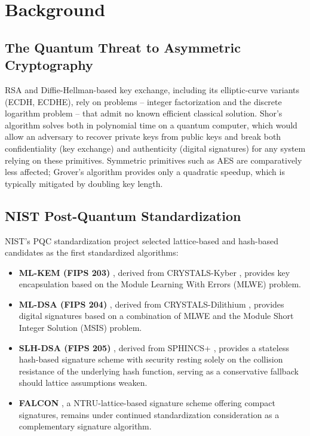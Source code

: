 \documentclass[conference]{IEEEtran}
\begin{document}
\section{Background}

\subsection{The Quantum Threat to Asymmetric Cryptography}

RSA and Diffie-Hellman-based key exchange, including its elliptic-curve
variants (ECDH, ECDHE), rely on problems -- integer factorization and the
discrete logarithm problem -- that admit no known efficient classical
solution. Shor's algorithm \cite{shor1997} solves both in polynomial time
on a quantum computer, which would allow an adversary to recover private
keys from public keys and break both confidentiality (key exchange) and
authenticity (digital signatures) for any system relying on these
primitives. Symmetric primitives such as AES are comparatively less
affected; Grover's algorithm provides only a quadratic speedup, which is
typically mitigated by doubling key length.

\subsection{NIST Post-Quantum Standardization}

NIST's PQC standardization project \cite{nist_pqc_project} selected
lattice-based and hash-based candidates as the first standardized
algorithms:

\begin{itemize}
  \item \textbf{ML-KEM (FIPS 203)} \cite{nist_fips203}, derived from
        CRYSTALS-Kyber \cite{kyber}, provides key encapsulation based on the
        Module Learning With Errors (MLWE) problem.
  \item \textbf{ML-DSA (FIPS 204)} \cite{nist_fips204}, derived from
        CRYSTALS-Dilithium \cite{dilithium}, provides digital signatures
        based on a combination of MLWE and the Module Short Integer
        Solution (MSIS) problem.
  \item \textbf{SLH-DSA (FIPS 205)} \cite{nist_fips205}, derived from
        SPHINCS+ \cite{sphincs}, provides a stateless hash-based signature
        scheme with security resting solely on the collision resistance of
        the underlying hash function, serving as a conservative fallback
        should lattice assumptions weaken.
  \item \textbf{FALCON} \cite{falcon}, a NTRU-lattice-based signature
        scheme offering compact signatures, remains under continued
        standardization consideration as a complementary signature
        algorithm.
\end{itemize}
\end{document}
